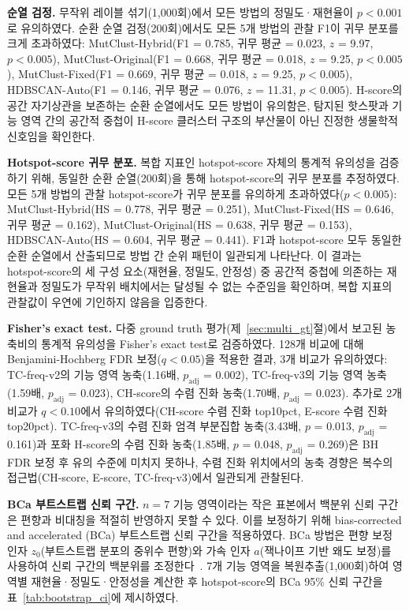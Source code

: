 \textbf{순열 검정.}
무작위 레이블 섞기(1,000회)에서 모든 방법의 정밀도·재현율이 $p < 0.001$로 유의하였다.
순환 순열 검정(200회)에서도 모든 5개 방법의 관찰 F1이 귀무 분포를 크게 초과하였다:
MutClust-Hybrid(F1 = 0.785, 귀무 평균 = 0.023, $z$ = 9.97, $p < 0.005$),
MutClust-Original(F1 = 0.668, 귀무 평균 = 0.018, $z$ = 9.25, $p < 0.005$),
MutClust-Fixed(F1 = 0.669, 귀무 평균 = 0.018, $z$ = 9.25, $p < 0.005$),
HDBSCAN-Auto(F1 = 0.146, 귀무 평균 = 0.076, $z$ = 11.31, $p < 0.005$).
H-score의 공간 자기상관을 보존하는 순환 순열에서도 모든 방법이 유의함은, 탐지된 핫스팟과 기능 영역 간의 공간적 중첩이 H-score 클러스터 구조의 부산물이 아닌 진정한 생물학적 신호임을 확인한다.

\textbf{Hotspot-score 귀무 분포.}
복합 지표인 hotspot-score 자체의 통계적 유의성을 검증하기 위해, 동일한 순환 순열(200회)을 통해 hotspot-score의 귀무 분포를 추정하였다.
모든 5개 방법의 관찰 hotspot-score가 귀무 분포를 유의하게 초과하였다($p < 0.005$):
MutClust-Hybrid(HS = 0.778, 귀무 평균 = 0.251),
MutClust-Fixed(HS = 0.646, 귀무 평균 = 0.162),
MutClust-Original(HS = 0.638, 귀무 평균 = 0.153),
HDBSCAN-Auto(HS = 0.604, 귀무 평균 = 0.441).
F1과 hotspot-score 모두 동일한 순환 순열에서 산출되므로 방법 간 순위 패턴이 일관되게 나타난다.
이 결과는 hotspot-score의 세 구성 요소(재현율, 정밀도, 안정성) 중 공간적 중첩에 의존하는 재현율과 정밀도가 무작위 배치에서는 달성될 수 없는 수준임을 확인하며, 복합 지표의 관찰값이 우연에 기인하지 않음을 입증한다.

\textbf{Fisher's exact test.}
다중 ground truth 평가(제~\ref{sec:multi_gt}절)에서 보고된 농축비의 통계적 유의성을 Fisher's exact test로 검증하였다.
128개 비교에 대해 Benjamini-Hochberg FDR 보정($q < 0.05$)을 적용한 결과, 3개 비교가 유의하였다:
TC-freq-v2의 기능 영역 농축(1.16배, $p_{\text{adj}}$ = 0.002),
TC-freq-v3의 기능 영역 농축(1.59배, $p_{\text{adj}}$ = 0.023),
CH-score의 수렴 진화 농축(1.70배, $p_{\text{adj}}$ = 0.023).
추가로 2개 비교가 $q < 0.10$에서 유의하였다(CH-score 수렴 진화 top10pct, E-score 수렴 진화 top20pct).
TC-freq-v3의 수렴 진화 엄격 부분집합 농축(3.43배, $p$ = 0.013, $p_{\text{adj}}$ = 0.161)과 포화 H-score의 수렴 진화 농축(1.85배, $p$ = 0.048, $p_{\text{adj}}$ = 0.269)은 BH FDR 보정 후 유의 수준에 미치지 못하나, 수렴 진화 위치에서의 농축 경향은 복수의 접근법(CH-score, E-score, TC-freq-v3)에서 일관되게 관찰된다.

\textbf{BCa 부트스트랩 신뢰 구간.}
$n = 7$ 기능 영역이라는 작은 표본에서 백분위 신뢰 구간은 편향과 비대칭을 적절히 반영하지 못할 수 있다.
이를 보정하기 위해 bias-corrected and accelerated (BCa) 부트스트랩 신뢰 구간을 적용하였다.
BCa 방법은 편향 보정 인자 $z_0$(부트스트랩 분포의 중위수 편향)와 가속 인자 $a$(잭나이프 기반 왜도 보정)를 사용하여 신뢰 구간의 백분위를 조정한다~\cite{efron1987better}.
7개 기능 영역을 복원추출(1,000회)하여 영역별 재현율·정밀도·안정성을 계산한 후 hotspot-score의 BCa 95\% 신뢰 구간을 표~\ref{tab:bootstrap_ci}에 제시하였다.

